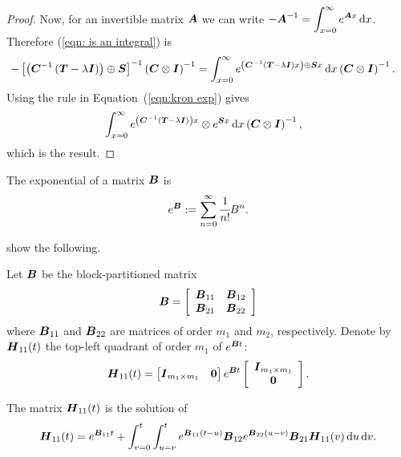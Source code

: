 \begin{proof}
	Now, for an invertible matrix \(\boldsymbol A\) we can write \(-\boldsymbol A^{-1} = \displaystyle\int_{x=0}^\infty e^{\boldsymbol Ax}\, \mathrm{d} x\). Therefore (\ref{eqn: is an integral}) is 
	\begin{align*}
		-\left[\left(\boldsymbol{C}^{-1}\left(\boldsymbol{T}-\lambda \boldsymbol{I}\right)\right)\oplus \boldsymbol{S}\right]^{-1}\left(\boldsymbol{C}\otimes \boldsymbol{I}\right)^{-1}
		&= \int_{x=0}^\infty e^{\left(\boldsymbol{C}^{-1}\left(\boldsymbol{T}-\lambda \boldsymbol{I}\right)x\right)\oplus \boldsymbol{S}x}\, \mathrm{d} x\left(\boldsymbol{C}\otimes \boldsymbol{I}\right)^{-1}.
	\end{align*}
	{Using the rule in Equation~(\ref{eqn:kron exp}) gives }
	\begin{align*}
		&\int_{x=0}^\infty e^{\left(\boldsymbol{C}^{-1}\left(\boldsymbol{T}-\lambda \boldsymbol{I}\right)\right)x}\otimes e^{ \boldsymbol{S}x}\, \mathrm{d} x\left(\boldsymbol{C}\otimes \boldsymbol{I}\right)^{-1},
	\end{align*}
	which is the result.
\end{proof}


The exponential of a matrix \(\boldsymbol B\) is \[e^{\boldsymbol B} := \sum_{n=0}^\infty \cfrac{1}{n!}B^n.\]

\cite{ln2015} show the following.
\begin{lem}\label{lem: sfkjgn}
	Let \(\boldsymbol B\) be the block-partitioned matrix
	\[\boldsymbol B = \left[\begin{array}{cc} \boldsymbol B_{11} & \boldsymbol B_{12} \\ \boldsymbol B_{21} & \boldsymbol B_{22} \end{array}\right]\]
	where \(\boldsymbol B_{11}\) and \(\boldsymbol B_{22}\) are matrices of order \(m_1\) and \(m_2\), respectively. Denote by \(\boldsymbol H_{11}(t)\) the top-left quadrant of order \(m_1\) of \(e^{\boldsymbol Bt}\):
	\[\boldsymbol H_{11}(t) = \begin{bmatrix} \boldsymbol I_{m_1\times m_1} & \boldsymbol 0 \end{bmatrix} e^{\boldsymbol Bt}\left[\begin{array}{c}\boldsymbol I_{m_1\times m_1} \\ \boldsymbol 0\end{array}\right].\]
	
	The matrix \(\boldsymbol H_{11}(t)\) is the solution of 
	\begin{align}\label{eqn: akg987LKJ}
		\boldsymbol H_{11}(t) = e^{\boldsymbol B_{11}t} + \int_{v=0}^t\int_{u=v}^t e^{\boldsymbol B_{11}(t-u)}\boldsymbol B_{12}e^{\boldsymbol B_{22}(u-v)}\boldsymbol B_{21}\boldsymbol H_{11}(v)\, \mathrm{d} u\, \mathrm{d} v.
	\end{align}
\end{lem}

